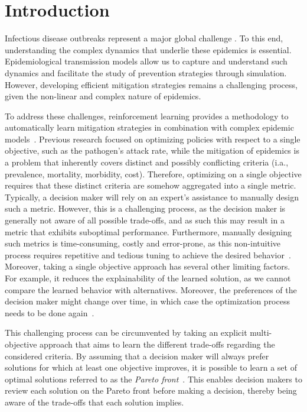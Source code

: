 \documentclass{article}
\renewcommand{\cite}[1]{\citep{#1}}
\begin{document}
\section{Introduction}
Infectious disease outbreaks represent a major global challenge \cite{miranda2022tale}. To this end, understanding the complex dynamics that underlie these epidemics is essential. Epidemiological transmission models allow us to capture and understand such dynamics and facilitate the study of prevention strategies through simulation. However, developing efficient mitigation strategies remains a challenging process, given the non-linear and complex nature of epidemics. 

To address these challenges, reinforcement learning provides a methodology to automatically learn mitigation strategies in combination with complex epidemic models~\cite{libin2020}.
Previous research focused on optimizing policies with respect to a single objective, such as the pathogen's attack rate, while the mitigation of epidemics is a problem that inherently covers distinct  and possibly conflicting criteria (i.a., prevalence, mortality, morbidity, cost). Therefore, optimizing on a single objective requires that  these distinct criteria are somehow aggregated into a single metric.
Typically, a decision maker will rely on an expert's assistance to manually design such a metric. However, this is a challenging process, as the decision maker is generally not aware of all possible trade-offs, and as such this may result in a metric that exhibits suboptimal performance. Furthermore, manually designing such metrics is time-consuming, costly and error-prone, as this non-intuitive process requires repetitive and tedious tuning to achieve the desired behavior~\cite{roijers2013survey}. Moreover, taking a single objective approach has several other limiting factors. For example, it reduces the explainability of the learned solution, as we cannot compare the learned behavior with alternatives. Moreover, the preferences of the decision maker might change over time, in which case the optimization process needs to be done again~\cite{hayes2021practical}. 

This challenging process can be circumvented by taking an explicit multi-objective approach that aims to learn the different trade-offs regarding the considered criteria. By assuming that a decision maker will always prefer solutions for which at least one objective improves, it is possible to learn a set of optimal solutions referred to as the \emph{Pareto front}~\cite{hayes2021practical}. This enables decision makers to review each solution on the Pareto front before making a decision, thereby being aware of the trade-offs that each solution implies. 
\end{document}
